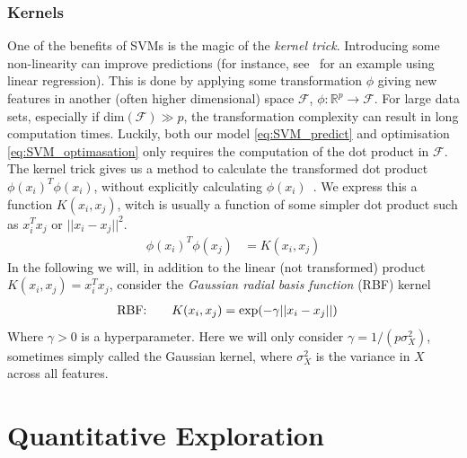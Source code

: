             \subsubsection{Kernels}
                One of the benefits of SVMs is the magic of the \textit{kernel trick}. Introducing some non-linearity can improve predictions (for instance, see~\citep{Project1} for an example using linear regression). This is done by applying some transformation $\phi$ giving new features in another (often higher dimensional) space $\mathcal{F}$, $\phi: \mathbb{R}^p \xrightarrow{} \mathcal{F}$. For large data sets, especially if $\text{dim}(\mathcal{F}) \gg p$, the transformation complexity can result in long computation times. Luckily, both our model \cref{eq:SVM_predict} and optimisation \cref{eq:SVM_optimasation} only requires the computation of the dot product in $\mathcal{F}$. The kernel trick  gives us a method to calculate the transformed dot product $\phi(x_i)^T \phi(x_i)$, without explicitly calculating $\phi(x_i)$~\citep{kernelTrick}. We express this a function $K(x_i, x_j)$, witch is usually a function of some simpler dot product such as $x_i^T x_j$ or $||x_i - x_j||^2$.    
                \begin{align*}
                    \phi(x_i)^T \phi(x_j) &= K(x_i, x_j)
                \end{align*}
                In the following we will, in addition to the linear (not transformed) product $K(x_i, x_j) = x_i^T x_j$, consider the \textit{Gaussian radial basis function} (RBF) kernel
                \begin{align}
                    \text{RBF:}\hspace{20px}& K(x_i, x_j) = \text{exp}(-\gamma ||x_i - x_j||)
                \end{align}
                Where $\gamma > 0$ is a hyperparameter. Here we will only consider $\gamma = 1/(p\sigma_X^2)$, sometimes simply called the Gaussian kernel, where $\sigma_X^2$ is the variance in $X$ across all features. 

    \section{Quantitative Exploration}

